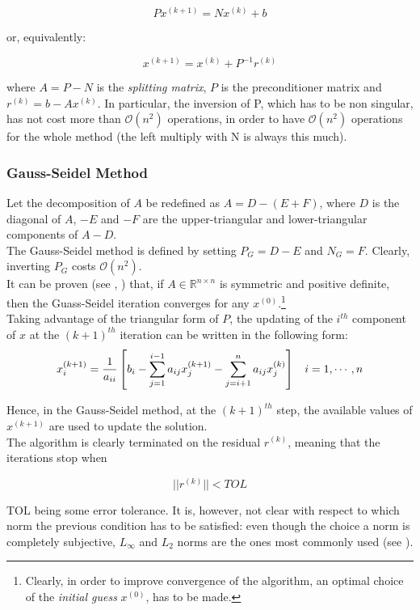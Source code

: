 \documentclass{article}
\theoremstyle{theorem}
\theoremstyle{definition}
\begin{document}
$$Px^{(k+1)}=Nx^{(k)}+b$$

or, equivalently:

$$x^{(k+1)}=x^{(k)}+P^{-1}r^{(k)}$$

where $A=P-N$ is the \emph{splitting matrix}, $P$ is the preconditioner matrix and $r^{(k)}=b-Ax^{(k)}$. In particular, the inversion of
P, which has to be non singular, has not cost more than $\mathcal{O}(n^2)$ operations, in order to have $\mathcal{O}(n^2)$ operations for the whole method (the left multiply with N is always this much).\\

\subsubsection{Gauss-Seidel Method}
Let the decomposition of $A$ be redefined as $A=D-(E+F)$, where $D$ is the diagonal of $A$, $-E$ and $-F$ are the upper-triangular and lower-triangular components of $A-D$.\\
The Gauss-Seidel method is defined by setting $P_G=D-E$ and $N_G=F$. Clearly, inverting $P_G$ costs $\mathcal{O}(n^2)$.\\
It can be proven (see \cite{lec-notes}, \cite{hac94}) that, if $A\in\mathbb{R}^{n\times n}$ is symmetric and positive definite, then the Guass-Seidel iteration converges for any $x^{(0)}$.\footnote{Clearly, in order to improve convergence of the algorithm, an optimal choice of the \emph{initial guess} $x^{(0)}$, has to be made. }\\
Taking advantage of the triangular form of $P$, the updating of the $i^{th}$ component of $x$ at the $(k+1)^{th}$ iteration can be written in the following form:
\begin{equation}
	\label{eqn:Gauss-Seidel}
	x_i^{(k+1)}=\frac{1}{a_{ii}}\left[b_i-\sum_{j=1}^{i-1}a_{ij}x_j^{(k+1)}-\sum_{j=i+1}^{n}a_{ij}x_j^{(k)}\right]\hspace{3mm} i=1,\cdots, n
\end{equation}

Hence, in the Gauss-Seidel method, at the $(k+1)^{th}$ step, the available values of $x^{(k+1)}$ are used to update the solution.\\
The algorithm is clearly terminated on the residual $r^{(k)}$, meaning that the iterations stop when

$$||r^{(k)}||<TOL$$

TOL being some error tolerance. It is, however, not clear with respect to which norm the previous condition has to be satisfied: even though the choice a norm is completely subjective, $L_\infty$ and $L_2$ norms are the ones most commonly used (see \cite{lec-notes}). 
\end{document}
